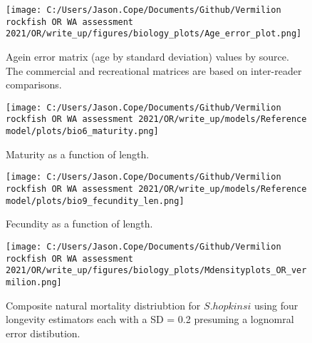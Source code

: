 \documentclass[11pt,
  english,
  a4paper,
]{article}
\begin{document}
\tagmcend\tagstructend


\begin{figure}
\centering
\texttt{[image: C:/Users/Jason.Cope/Documents/Github/Vermilion rockfish OR WA assessment 2021/OR/write\_up/figures/biology\_plots/Age\_error\_plot.png]}
\caption{Agein error matrix (age by standard deviation) values by source. The commercial and recreational matrices are based on inter-reader comparisons.\label{fig:age-error}}
\end{figure}

\tagmcend\tagstructend


\begin{figure}
\centering
\texttt{[image: C:/Users/Jason.Cope/Documents/Github/Vermilion rockfish OR WA assessment 2021/OR/write\_up/models/Reference model/plots/bio6\_maturity.png]}
\caption{Maturity as a function of length.\label{fig:maturity}}
\end{figure}

\tagmcend\tagstructend


\begin{figure}
\centering
\texttt{[image: C:/Users/Jason.Cope/Documents/Github/Vermilion rockfish OR WA assessment 2021/OR/write\_up/models/Reference model/plots/bio9\_fecundity\_len.png]}
\caption{Fecundity as a function of length.\label{fig:fecundity}}
\end{figure}

\tagmcend\tagstructend


\begin{figure}
\centering
\texttt{[image: C:/Users/Jason.Cope/Documents/Github/Vermilion rockfish OR WA assessment 2021/OR/write\_up/figures/biology\_plots/Mdensityplots\_OR\_vermilion.png]}
\caption{Composite natural mortality distriubtion for {\(S. hopkinsi\)\leavevmode\tagmcend\tagstructend} using four longevity estimators each with a SD = 0.2 presuming a lognomral error distibution.\label{fig:M_composite_dists}}
\end{figure}
\end{document}
